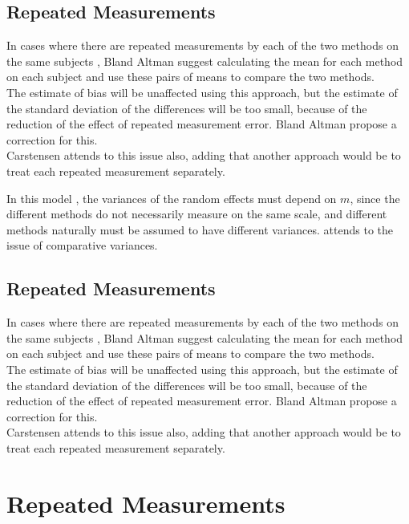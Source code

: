 
\subsection{Repeated Measurements }
In cases where there are repeated measurements by each of the two
methods on the same subjects , Bland Altman suggest calculating
the mean for each method on each subject and use these pairs of
means to compare the two methods.
\\
The estimate of bias will be unaffected using this approach, but
the estimate of the standard deviation of the differences will be
too small, because of the reduction of the effect of repeated
measurement error. Bland Altman propose a correction for this.
\\
Carstensen attends to this issue also, adding that another
approach would be to treat each repeated measurement separately.


In this model , the variances of the random effects must depend on
$m$, since the different methods do not necessarily measure on the
same scale, and different methods naturally must be assumed to
have different variances. \citet{BXC2004} attends to the issue of
comparative variances.



\newpage


\subsection{Repeated Measurements }
In cases where there are repeated measurements by each of the two
methods on the same subjects , Bland Altman suggest calculating
the mean for each method on each subject and use these pairs of
means to compare the two methods.
\\
The estimate of bias will be unaffected using this approach, but
the estimate of the standard deviation of the differences will be
too small, because of the reduction of the effect of repeated
measurement error. Bland Altman propose a correction for this.
\\
Carstensen attends to this issue also, adding that another
approach would be to treat each repeated measurement separately.
\newpage
\section{Repeated Measurements}

